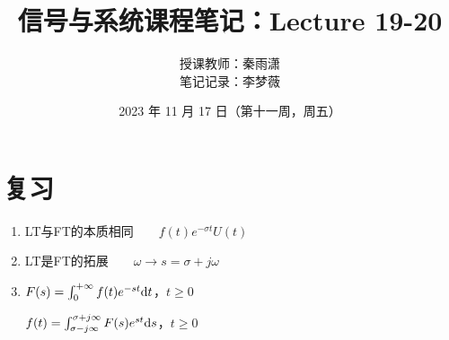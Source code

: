 \documentclass[UTF8]{ctexart}
\begin{document}
\title{信号与系统课程笔记：Lecture 19-20}
\author{授课教师：秦雨潇 \\
        笔记记录：李梦薇}
\date{2023 年 11 月 17 日（第十一周，周五）}
\maketitle

\section{复习}
\begin{enumerate}[label=(\arabic*),itemindent=0pt,labelindent=\parindent,labelwidth=2em,labelsep=5pt,leftmargin=*]
      \item LT与FT的本质相同$\qquad{f(t)e^{-\sigma{t}}U(t)}$
      \item LT是FT的拓展$\qquad{\omega\rightarrow{s=\sigma+j\omega}}$
      \item $F(s)=\int_{0}^{+\infty}f(t)e^{-st}{\rm{d}}t$，$t\geqslant0$ \par
            $f(t)=\int_{\sigma-j\infty}^{\sigma+j\infty}F(s)e^{st}{\rm{d}}s$，$t\geqslant0$
\end{enumerate}\par
\end{document}
